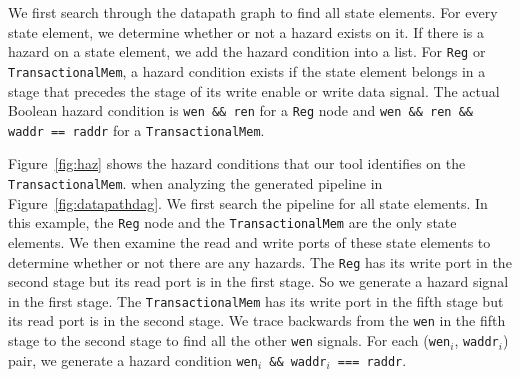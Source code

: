 We first search through the datapath graph to find all state
elements. For every state element, we determine whether or not a
hazard exists on it. If there is a hazard on a state element, we add
the hazard condition into a list. For {\tt Reg} or {\tt TransactionalMem}, a
hazard condition exists if the state element belongs in a stage that precedes the
stage of its write enable or write data signal. The actual Boolean
hazard condition is {\tt wen \&\& ren} for a {\tt Reg} node and
{\tt wen \&\& ren \&\& waddr == raddr} for a {\tt TransactionalMem}.

Figure~\ref{fig:haz} shows the hazard conditions that our tool
identifies on the {\tt TransactionalMem}. when analyzing the generated pipeline in
Figure~\ref{fig:datapathdag}. We first search the pipeline for all
state elements. In this example, the {\tt Reg} node and the 
{\tt TransactionalMem} are the only state elements. We then examine
the read and write ports of these state elements to determine whether
or not there are any hazards. The {\tt Reg} has its write port in the
second stage but its read port is in the first stage. So we generate a
hazard signal in the first stage. The {\tt TransactionalMem} has its
write port in the fifth stage but its read port is in the second
stage. We trace backwards from the {\tt wen} in the fifth stage to the
second stage to find all the other {\tt wen} signals. For each 
({\tt wen}$_i$, {\tt waddr}$_i$) pair, we generate a hazard condition
{\tt wen$_i$ \&\& waddr$_i$ === raddr}.

